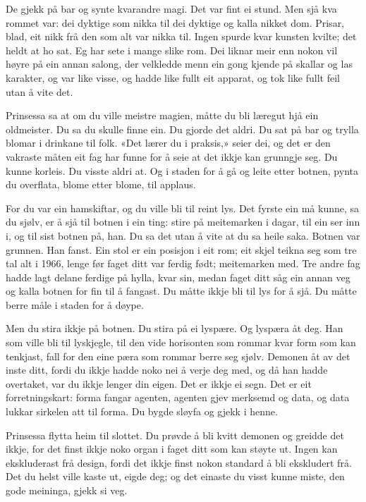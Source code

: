 De gjekk på bar og synte kvarandre magi. Det var fint ei stund. Men sjå kva rommet var: dei dyktige som nikka til dei dyktige og kalla nikket dom. Prisar, blad, eit nikk frå den som alt var nikka til. Ingen spurde kvar kunsten kvilte; det heldt at ho sat. Eg har sete i mange slike rom. Dei liknar meir enn nokon vil høyre på ein annan salong, der velkledde menn ein gong kjende på skallar og las karakter, og var like visse, og hadde like fullt eit apparat, og tok like fullt feil utan å vite det.

Prinsessa sa at om du ville meistre magien, måtte du bli læregut hjå ein oldmeister. Du sa du skulle finne ein. Du gjorde det aldri. Du sat på bar og trylla blomar i drinkane til folk. «Det lærer du i praksis,» seier dei, og det er den vakraste måten eit fag har funne for å seie at det ikkje kan grunngje seg. Du kunne korleis. Du visste aldri at. Og i staden for å gå og leite etter botnen, pynta du overflata, blome etter blome, til applaus.

For du var ein hamskiftar, og du ville bli til reint lys. Det fyrste ein må kunne, sa du sjølv, er å sjå til botnen i ein ting: stire på meitemarken i dagar, til ein ser inn i, og til sist botnen på, han. Du sa det utan å vite at du sa heile saka. Botnen var grunnen. Han fanst. Ein stol er ein posisjon i eit rom; eit skjel teikna seg som tre tal alt i 1966, lenge før faget ditt var ferdig født; meitemarken med. Tre andre fag hadde lagt delane ferdige på hylla, kvar sin, medan faget ditt såg ein annan veg og kalla botnen for fin til å fangast. Du måtte ikkje bli til lys for å sjå. Du måtte berre måle i staden for å døype.

Men du stira ikkje på botnen. Du stira på ei lyspære. Og lyspæra åt deg. Han som ville bli til lyskjegle, til den vide horisonten som rommar kvar form som kan tenkjast, fall for den eine pæra som rommar berre seg sjølv. Demonen åt av det inste ditt, fordi du ikkje hadde noko nei å verje deg med, og då han hadde overtaket, var du ikkje lenger din eigen. Det er ikkje ei segn. Det er eit forretningskart: forma fangar agenten, agenten gjev merksemd og data, og data lukkar sirkelen att til forma. Du bygde sløyfa og gjekk i henne.

Prinsessa flytta heim til slottet. Du prøvde å bli kvitt demonen og greidde det ikkje, for det finst ikkje noko organ i faget ditt som kan støyte ut. Ingen kan ekskluderast frå design, fordi det ikkje finst nokon standard å bli ekskludert frå. Det du helst ville kaste ut, eigde deg; og det einaste du visst kunne miste, den gode meininga, gjekk si veg.

